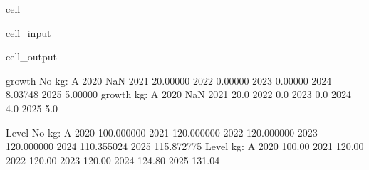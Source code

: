 \documentclass[letterpaper,10pt,english]{jupyterBook}
\begin{document}
\begin{sphinxuseclass}{cell}\begin{sphinxVerbatimInput}

\begin{sphinxuseclass}{cell_input}
\begin{sphinxVerbatim}[commandchars=\\\{\}]
  

  


\end{sphinxVerbatim}

\end{sphinxuseclass}\end{sphinxVerbatimInput}
\begin{sphinxVerbatimOutput}

\begin{sphinxuseclass}{cell_output}
\begin{sphinxVerbatim}[commandchars=\\\{\}]
growth No kg:
             A
2020       NaN
2021  20.00000
2022   0.00000
2023   0.00000
2024  \PYGZhy{}8.03748
2025   5.00000
growth kg:
         A
2020   NaN
2021  20.0
2022   0.0
2023   0.0
2024   4.0
2025   5.0


Level No kg:
               A
2020  100.000000
2021  120.000000
2022  120.000000
2023  120.000000
2024  110.355024
2025  115.872775
Level kg:
           A
2020  100.00
2021  120.00
2022  120.00
2023  120.00
2024  124.80
2025  131.04
\end{sphinxVerbatim}

\end{sphinxuseclass}\end{sphinxVerbatimOutput}

\end{sphinxuseclass}
\end{document}
